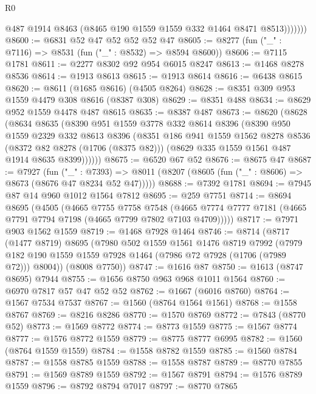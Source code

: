\begin{lexlean}{R0}
\begin{coremodule}
                @487
                @1914
                @8463
                (@8465 @190 @1559 @1559 @332 @1464 @8471 @8513)))))))
@8600 := @6831 @52 @47 @52 @52 @52 @47
@8605 := @8277 (fun ("_" : @7116) => @8531 (fun ("_" : @8532) => @8594 @8600))
@8606 := @7115 @1781
@8611 := @2277 @8302 @92 @954 @6015 @8247
@8613 := @1468 @8278 @8536
@8614 := @1913 @8613
@8615 := @1913 @8614
@8616 := @6438 @8615
@8620 := @8611 (@1685 @8616) (@4505 @8264)
@8628 := @8351 @309 @953 @1559 @4479 @308 @8616 (@8387 @308)
@8629 := @8351 @488
@8634 := @8629 @952 @1559 @4478 @487 @8615
@8635 := @8387 @487
@8673 := @8620
    (@8628
      (@8634
        @8635
        (@8390
          @951
          @1559
          @3778
          @332
          @8614
          @8396
          (@8390
            @950
            @1559
            @2329
            @332
            @8613
            @8396
            (@8351
              @186
              @941
              @1559
              @1562
              @8278
              @8536
              (@8372 @82 @8278 (@1706 (@8375 @82)))
              (@8629 @335 @1559 @1561 @487 @1914 @8635 @8399))))))
@8675 := @6520 @67 @52
@8676 := @8675 @47
@8687 := @7927
    (fun ("_" : @7393) =>
    @8011 (@8207 (@8605 (fun ("_" : @8606) => @8673 (@8676 @47 @8234 @52 @47)))))
@8688 := @7392 @1781
@8694 := @7945 @87 @14 @960 @1012 @1564 @7812
@8695 := @259 @7751
@8714 := @8694
    @8695
    (@4505
      (@4665
        @7755
        @7758
        @7548
        (@4665 @7774 @7777 @7181 (@4665 @7791 @7794 @7198 (@4665 @7799 @7802 @7103 @4709)))))
@8717 := @7971 @903 @1562 @1559
@8719 := @1468 @7928 @1464
@8746 := @8714
    (@8717
      (@1477 @8719)
      @8695
      (@7980
        @502
        @1559
        @1561
        @1476
        @8719
        @7992
        (@7979 @182 @190 @1559 @1559 @7928 @1464 (@7986 @72 @7928 (@1706 (@7989 @72))) @8004))
      (@8008 @7750))
@8747 := @1616 @87
@8750 := @1613 (@8747 @8695) @7944
@8755 := @1656 @8750 @963 @968 @1011 @1564
@8760 := @6970 @7817 @57 @47 @52 @52
@8762 := @1667 (@6016 @8760)
@8764 := @1567 @7534 @7537
@8767 := @1560 (@8764 @1564 @1561)
@8768 := @1558 @8767
@8769 := @8216 @8286
@8770 := @1570 @8769
@8772 := @7843 (@8770 @52)
@8773 := @1569 @8772
@8774 := @8773 @1559
@8775 := @1567 @8774
@8777 := @1576 @8772 @1559
@8779 := @8775 @8777 @6995
@8782 := @1560 (@8764 @1559 @1559)
@8784 := @1558 @8782 @1559
@8785 := @1560 @8784
@8787 := @1558 @8785 @1559
@8788 := @1558 @8787
@8789 := @8770 @7855
@8791 := @1569 @8789 @1559
@8792 := @1567 @8791
@8794 := @1576 @8789 @1559
@8796 := @8792 @8794 @7017
@8797 := @8770 @7865

\end{coremodule}
\end{lexlean}
